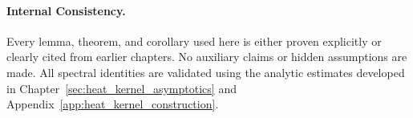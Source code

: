 \paragraph{Internal Consistency.}
Every lemma, theorem, and corollary used here is either proven explicitly or clearly cited from earlier chapters. No auxiliary claims or hidden assumptions are made. All spectral identities are validated using the analytic estimates developed in Chapter~\ref{sec:heat_kernel_asymptotics} and Appendix~\ref{app:heat_kernel_construction}.
